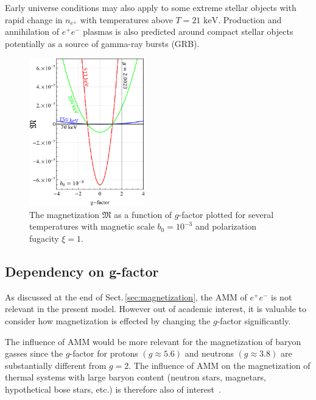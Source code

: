 \documentclass[aps,prd,floatfix,reprint]{revtex4-2}
\newcommand*{\keV}{\text{ keV}}
\newcommand{\rsec}[1]{Sect.\,{\ref{#1}}}
\begin{document}
Early universe conditions may also apply to some extreme stellar objects with rapid change in $n_{e^{\pm}}$ with temperatures above $T=21\keV$. Production and annihilation of $e^{+}e^{-}$ plasmas is also predicted around compact stellar objects~\cite{Ruffini:2009hg,Ruffini:2012it} potentially as a source of gamma-ray bursts (GRB).

\begin{figure}[ht]
 \centering
 \includegraphics[width=0.45\textwidth]{plots/GFactor_05.png}
 \caption{The magnetization $\mathfrak M$ as a function of $g$-factor plotted for several temperatures with magnetic scale $b_{0}=10^{-3}$ and polarization fugacity $\xi=1$.}
 \label{fig:gfac} 
\end{figure}

\subsection{Dependency on g-factor}
\label{sec:gfac}

\noindent As discussed at the end of \rsec{sec:magnetization}, the AMM of $e^{+}e^{-}$ is not relevant in the present model. However out of academic interest, it is valuable to consider how magnetization is effected by changing the $g$-factor significantly.

The influence of AMM would be more relevant for the magnetization of baryon gasses since the $g$-factor for protons $(g\approx5.6)$ and neutrons $(g\approx3.8)$ are substantially different from $g=2$. The influence of AMM on the magnetization of thermal systems with large baryon content (neutron stars, magnetars, hypothetical bose stars, etc.) is therefore also of interest~\cite{Ferrer:2019xlr,Ferrer:2023pgq}.
\end{document}
